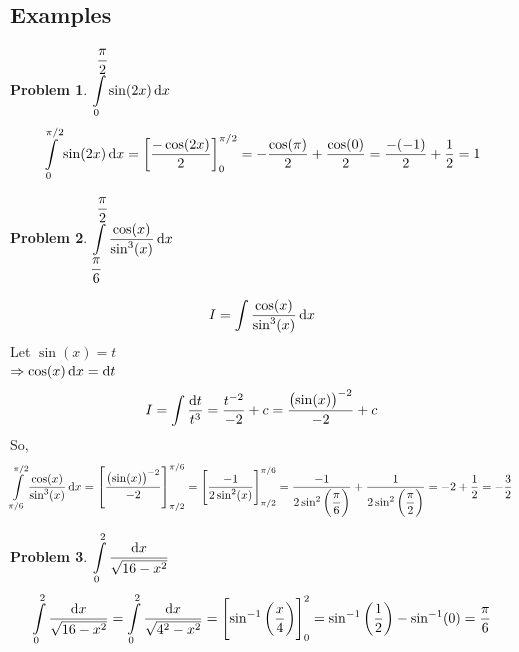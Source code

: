 \documentclass[14]{article}
\theoremstyle{definition}
\newtheorem{prob}{Problem}
\theoremstyle{case}
\begin{document}
\subsection{Examples}
\begin{prob}
$\displaystyle \int\limits_0^{\dfrac{\pi}{2}} \sin(2x) \dif x$
\[\int\limits_0^{\pi/2} \sin(2x) \dif x = \left[ \dfrac{-\cos(2x)}{2} \right]_0^{\pi/2} = -\dfrac{\cos(\pi)}{2} + \dfrac{\cos(0)}{2} = \dfrac{-(-1)}{2} + \dfrac12 = 1 \]
\end{prob}
\begin{prob}
$\displaystyle \int\limits_{\dfrac{\pi}6}^{\dfrac{\pi}2} \dfrac{\cos(x)}{\sin^3(x)} \dif x $
\end{prob}
\[I = \int\dfrac{\cos(x)}{\sin^3(x)} \dif x \]
Let $\sin(x) = t$\\
$\Rightarrow \cos(x) \dif x = \dif t$\\
\[I = \int \dfrac{\dif t}{t^3} = \dfrac{t^{-2}}{-2} + c = \dfrac{\left( \sin(x) \right)^{-2}}{-2} + c\]
So,
\[\displaystyle \int\limits_{\pi/6}^{\pi/2} \dfrac{\cos(x)}{\sin^3(x)} \dif x = \left[ \dfrac{\left(\sin(x)\right)^{-2}}{-2}   \right]_{\pi/2}^{\pi/6} = \left[ \dfrac{-1}{2\sin^2(x)} \right]_{\pi/2}^{\pi/6} = \dfrac{-1}{2\sin^2\left(\dfrac{\pi}{6} \right)} + \dfrac1{2\sin^2\left( \dfrac{\pi}{2} \right)} = -2 + \dfrac12 = -\dfrac32\]
\begin{prob}
$\displaystyle \int\limits_0^2 \dfrac{\dif x}{\sqrt{16 - x^2}}$
\[\int\limits_0^2 \dfrac{\dif x}{\sqrt{16 - x^2}} = \int\limits_0^2 \dfrac{\dif x}{\sqrt{4^2 - x^2}} = \left[ \sin^{-1}\left(\dfrac{x}4 \right) \right]_0^2 = \sin^{-1}\left(\dfrac12 \right) - \sin^{-1}(0) = \dfrac{\pi}{6}\]
\end{prob}
\pagebreak
\end{document}
